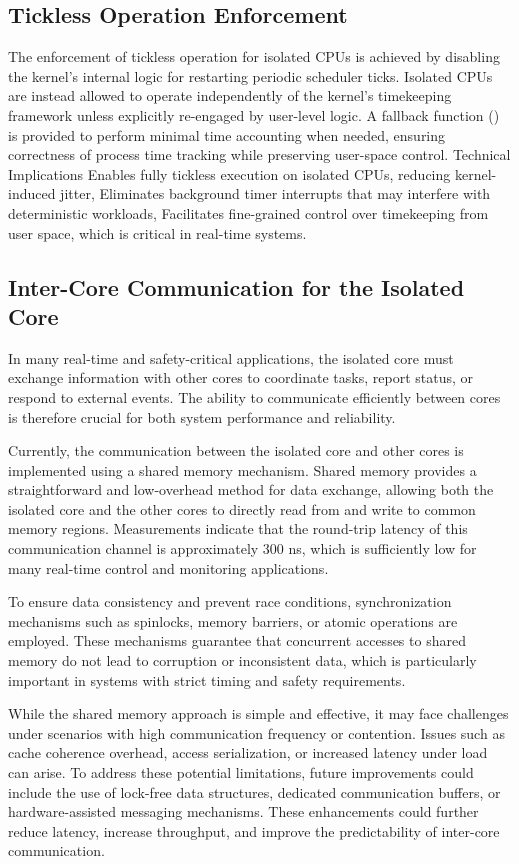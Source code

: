 \documentclass[letterpaper]{article}
\begin{document}
\subsection{Tickless Operation Enforcement}
The enforcement of tickless operation for isolated CPUs is achieved by disabling the kernel's
internal logic for restarting periodic scheduler ticks. Isolated CPUs are instead allowed to operate
independently of the kernel's timekeeping framework unless explicitly re-engaged by user-level
logic.
A fallback function () is provided to perform minimal time accounting when needed, ensuring
correctness of process time tracking while preserving user-space control.
Technical Implications
Enables fully tickless execution on isolated CPUs, reducing kernel-induced jitter,
Eliminates background timer interrupts that may interfere with deterministic workloads,
Facilitates fine-grained control over timekeeping from user space, which is critical in real-time
systems.

\subsection{Inter-Core Communication for the Isolated Core}

In many real-time and safety-critical applications, the isolated core must exchange information
with other cores to coordinate tasks, report status, or respond to external events. The ability
to communicate efficiently between cores is therefore crucial for both system performance and reliability. 

Currently, the communication between the isolated core and other cores is implemented using
a shared memory mechanism. Shared memory provides a straightforward and low-overhead method for
data exchange, allowing both the isolated core and the other cores to directly read from and
write to common memory regions. Measurements indicate that the round-trip latency of this
communication channel is approximately 300 ns, which is sufficiently low for many real-time control and monitoring applications.

To ensure data consistency and prevent race conditions, synchronization mechanisms such as
spinlocks, memory barriers, or atomic operations are employed. These mechanisms guarantee that
concurrent accesses to shared memory do not lead to corruption or inconsistent data, which is
particularly important in systems with strict timing and safety requirements.

While the shared memory approach is simple and effective, it may face challenges under scenarios
with high communication frequency or contention. Issues such as cache coherence overhead, access
serialization, or increased latency under load can arise. To address these potential limitations,
future improvements could include the use of lock-free data structures, dedicated communication
buffers, or hardware-assisted messaging mechanisms. These enhancements could further reduce latency,
increase throughput, and improve the predictability of inter-core communication.
\end{document}
